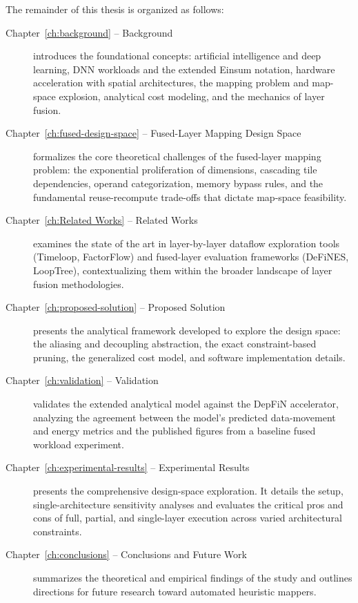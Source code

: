 The remainder of this thesis is organized as follows:

\begin{description}
  \item[Chapter~\ref{ch:background} -- Background]
    introduces the foundational concepts: artificial intelligence
    and deep learning, DNN workloads and the extended Einsum notation,
    hardware acceleration with spatial architectures, the mapping
    problem and map-space explosion, analytical cost modeling,
    and the mechanics of layer fusion.

  \item[Chapter~\ref{ch:fused-design-space} -- Fused-Layer Mapping Design Space]
    formalizes the core theoretical challenges of the fused-layer mapping problem:
    the exponential proliferation of dimensions, cascading tile dependencies,
    operand categorization, memory bypass rules, and the fundamental
    reuse-recompute trade-offs that dictate map-space feasibility.

   \item[Chapter~\ref{ch:Related Works} -- Related Works]
    examines the state of the art in layer-by-layer dataflow
    exploration tools (Timeloop, FactorFlow) and fused-layer 
    evaluation frameworks (DeFiNES, LoopTree), contextualizing 
    them within the broader landscape of layer fusion methodologies.


  \item[Chapter~\ref{ch:proposed-solution} -- Proposed Solution]
    presents the analytical framework developed to explore the design space:
    the aliasing and decoupling abstraction, the exact constraint-based
    pruning, the generalized cost model, and
    software implementation details.

  \item[Chapter~\ref{ch:validation} -- Validation]
    validates the extended analytical model against the DepFiN accelerator,
    analyzing the agreement between the model's predicted data-movement and energy metrics and the published figures from a baseline fused workload experiment.

  \item[Chapter~\ref{ch:experimental-results} -- Experimental Results]
    presents the comprehensive design-space exploration. It details the setup,
    single-architecture sensitivity analyses and evaluates the critical pros and cons of full, partial, and single-layer execution across varied architectural constraints.

  \item[Chapter~\ref{ch:conclusions} -- Conclusions and Future Work]
    summarizes the theoretical and empirical findings of the study and
    outlines directions for future research toward automated heuristic mappers.
\end{description}